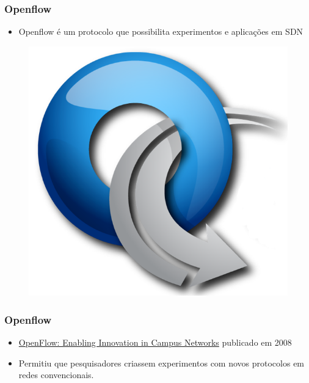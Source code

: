 %
%
\begin{frame}\frametitle{Openflow}

    \begin{itemize}
    \item Openflow é um protocolo que possibilita experimentos e aplicações
          em SDN
    \end{itemize}
    \begin{figure}[h]
        \centering
        \includegraphics[scale=0.3]{images/openflow.png}
    \end{figure}
\end{frame}


%
%
\begin{frame}\frametitle{Openflow}

    \begin{itemize}
        \setlength{\itemsep}{.5cm}
    \item \href{http://archive.openflow.org/documents/openflow-wp-latest.pdf}
        {OpenFlow: Enabling Innovation in Campus Networks} publicado em 2008 
    \item Permitiu que pesquisadores criassem experimentos com novos
          protocolos em redes convencionais.
    \end{itemize}

\end{frame}




